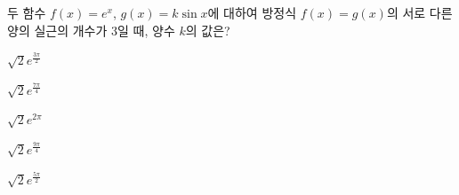 두 함수 $f(x)=e^x$, $g(x)=k\sin x$에 대하여 방정식 $f(x)=g(x)$의 서로 다른 양의 실근의 개수가 $3$일 때, 양수 $k$의 값은?
\begin{choices32}{\rule[-3ex]{0pt}{8ex}$\sqrt{2}e^{\frac{3\pi}{2}}$}{\rule[-3ex]{0pt}{8ex}$\sqrt{2}e^{\frac{7\pi}{4}}$}{\rule[-3ex]{0pt}{8ex}$\sqrt{2}e^{2\pi}$}{\rule[-3ex]{0pt}{8ex}$\sqrt{2}e^{\frac{9\pi}{4}}$}{\rule[-3ex]{0pt}{8ex}$\sqrt{2}e^{\frac{5\pi}{2}}$}\end{choices32}
